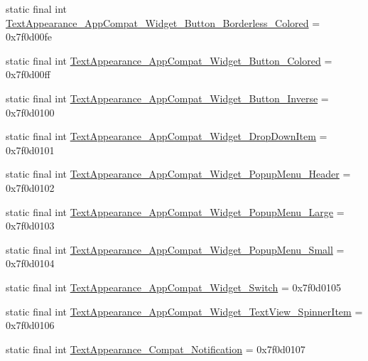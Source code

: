 \begin{DoxyCompactItemize}
\item 
static final int \mbox{\hyperlink{classandroid_1_1support_1_1v7_1_1appcompat_1_1R_1_1style_a7046ffbded4909cefd30ce237eb1ac8e}{Text\+Appearance\+\_\+\+App\+Compat\+\_\+\+Widget\+\_\+\+Button\+\_\+\+Borderless\+\_\+\+Colored}} = 0x7f0d00fe
\item 
static final int \mbox{\hyperlink{classandroid_1_1support_1_1v7_1_1appcompat_1_1R_1_1style_a3ee8166f982b74964bde96f9da028b09}{Text\+Appearance\+\_\+\+App\+Compat\+\_\+\+Widget\+\_\+\+Button\+\_\+\+Colored}} = 0x7f0d00ff
\item 
static final int \mbox{\hyperlink{classandroid_1_1support_1_1v7_1_1appcompat_1_1R_1_1style_ac142dc7e75b7e898146711016297324e}{Text\+Appearance\+\_\+\+App\+Compat\+\_\+\+Widget\+\_\+\+Button\+\_\+\+Inverse}} = 0x7f0d0100
\item 
static final int \mbox{\hyperlink{classandroid_1_1support_1_1v7_1_1appcompat_1_1R_1_1style_a324d7ce5b9cf28cccb21d06ec310517e}{Text\+Appearance\+\_\+\+App\+Compat\+\_\+\+Widget\+\_\+\+Drop\+Down\+Item}} = 0x7f0d0101
\item 
static final int \mbox{\hyperlink{classandroid_1_1support_1_1v7_1_1appcompat_1_1R_1_1style_a6429436d9eea603ce9b9fbafd23187e7}{Text\+Appearance\+\_\+\+App\+Compat\+\_\+\+Widget\+\_\+\+Popup\+Menu\+\_\+\+Header}} = 0x7f0d0102
\item 
static final int \mbox{\hyperlink{classandroid_1_1support_1_1v7_1_1appcompat_1_1R_1_1style_acddbaf164ab34ab838b8cd518569c0c7}{Text\+Appearance\+\_\+\+App\+Compat\+\_\+\+Widget\+\_\+\+Popup\+Menu\+\_\+\+Large}} = 0x7f0d0103
\item 
static final int \mbox{\hyperlink{classandroid_1_1support_1_1v7_1_1appcompat_1_1R_1_1style_a0bd9421bc05565e838564318f68e8109}{Text\+Appearance\+\_\+\+App\+Compat\+\_\+\+Widget\+\_\+\+Popup\+Menu\+\_\+\+Small}} = 0x7f0d0104
\item 
static final int \mbox{\hyperlink{classandroid_1_1support_1_1v7_1_1appcompat_1_1R_1_1style_a044e8db0d422a2d88ab08436b642f8f1}{Text\+Appearance\+\_\+\+App\+Compat\+\_\+\+Widget\+\_\+\+Switch}} = 0x7f0d0105
\item 
static final int \mbox{\hyperlink{classandroid_1_1support_1_1v7_1_1appcompat_1_1R_1_1style_a7122ada05dc3c4ad71c8ed067b0bf22e}{Text\+Appearance\+\_\+\+App\+Compat\+\_\+\+Widget\+\_\+\+Text\+View\+\_\+\+Spinner\+Item}} = 0x7f0d0106
\item 
static final int \mbox{\hyperlink{classandroid_1_1support_1_1v7_1_1appcompat_1_1R_1_1style_aac60ecef7312e109dcc9fe0fbf8c0631}{Text\+Appearance\+\_\+\+Compat\+\_\+\+Notification}} = 0x7f0d0107

\end{DoxyCompactItemize}

